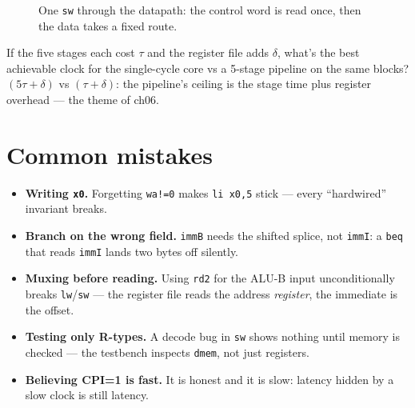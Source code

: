 \begin{figure}[t]
\centering

\caption[sw cycle flow]{One \texttt{sw} through the datapath: the
control word is read once, then the data takes a fixed route.}
\label{fig:cycleflow05}
\end{figure}

\begin{checkpoint}[predict CPI=1's cost]\label{cp:cpi05}
If the five stages each cost $\tau$ and the register file adds
$\delta$, what's the best achievable clock for the single-cycle core
vs a 5-stage pipeline on the same blocks? $(5\tau+\delta)$ vs
$(\tau+\delta)$: the pipeline's ceiling is the stage time plus
register overhead --- the theme of ch06.
\end{checkpoint}

\section{Common mistakes}
\label{sec:mistakes05}
\begin{itemize}
\item \textbf{Writing \texttt{x0}.} Forgetting \texttt{wa!=0} makes
      \texttt{li x0,5} stick --- every ``hardwired'' invariant breaks.
\item \textbf{Branch on the wrong field.} \texttt{immB} needs the
      shifted splice, not \texttt{immI}: a \texttt{beq} that reads
      \texttt{immI} lands two bytes off silently.
\item \textbf{Muxing before reading.} Using \texttt{rd2} for the
      ALU-B input unconditionally breaks \texttt{lw}/\texttt{sw} ---
      the register file reads the address \emph{register}, the
      immediate is the offset.
\item \textbf{Testing only R-types.} A decode bug in \texttt{sw}
      shows nothing until memory is checked --- the testbench inspects
      \texttt{dmem}, not just registers.
\item \textbf{Believing CPI=1 is fast.} It is honest and it is slow:
      latency hidden by a slow clock is still latency.
\end{itemize}

